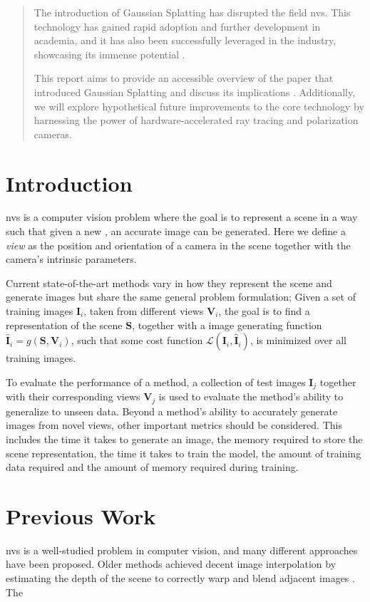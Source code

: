 \begin{abstract}
    The introduction of Gaussian Splatting has disrupted the field \gls{nvs}. This technology has gained rapid adoption and further development in academia, and it has also been successfully leveraged in the industry, showcasing its immense potential \cite{LumaAIVideo}.

    This report aims to provide an accessible overview of the paper that introduced Gaussian Splatting and discuss its implications \cite{kerbl3DGaussianSplatting2023}.
    Additionally, we will explore hypothetical future improvements to the core technology by harnessing the power of hardware-accelerated ray tracing and polarization cameras.


\end{abstract}

\section{Introduction}
\gls{nvs} is a computer vision problem where the goal is to represent a scene in a way such that given a new , an accurate image can be generated.
Here we define a \textit{view} as the position and orientation of a camera in the scene together with the camera's intrinsic parameters.

Current state-of-the-art methods vary in how they represent the scene and generate images
but share the same general problem formulation;
Given a set of training images $\bm{I}_i$,
taken from different views $\bm{V}_i$,
the goal is to find a representation of the scene $\bm{S}$,
together with a image generating function $\bm{\hat{I}}_i = g(\bm{S}, \bm{V}_i)$,
such that some cost function $\mathcal{L}(\bm{I}_i, \bm{\hat{I}}_i)$,
is minimized over all training images.

To evaluate the performance of a method, a collection of test images $\bm{I}_j$ together with their corresponding views $\bm{V}_j$ is used to evaluate the method's ability to generalize to unseen data.
Beyond a method's ability to accurately generate images from novel views, other important metrics should be considered.
This includes the time it takes to generate an image, the memory required to store the scene representation, the time it takes to train the model, the amount of training data required and the amount of memory required during training.



\section{Previous Work}
\gls{nvs} is a well-studied problem in computer vision, and many different approaches have been proposed.
Older methods achieved decent image interpolation by estimating the depth of the scene to correctly warp and blend adjacent images \cite{zitnickHighqualityVideoView2004}.
The

